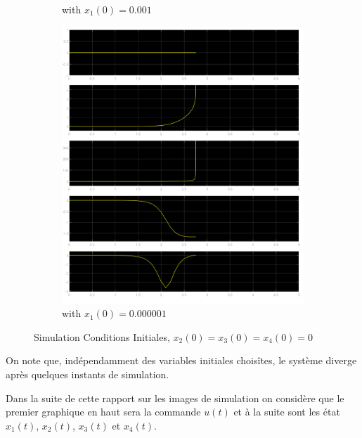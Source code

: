 \documentclass[class=article, crop=false]{standalone}
\begin{document}
\begin{resolution}
\begin{figure}[H]
\begin{subfigure}[b]{0.475\textwidth}
            \caption{with $x_1(0) = 0.001$}
        \end{subfigure}
        \begin{subfigure}[b]{0.475\textwidth}
            \centering
            \includegraphics[width=\textwidth]{../images/simulink_scope2_0_000001.png}
            \caption{with $x_1(0) = 0.000001$}
        \end{subfigure}
        \caption{Simulation Conditions Initiales, $x_2(0) = x_3(0) = x_4(0) = 0$}
        \label{fig:simulink_simulation_conditions_initiales}
    \end{figure}
    On note que, indépendamment des variables initiales choisîtes, le système diverge après quelques instants de simulation.
    \begin{phrase}
        Dans la suite de cette rapport sur les images de simulation on considère que le premier graphique en haut sera la commande $u(t)$ et à la suite sont les état $x_1(t)$, $x_2(t)$, $x_3(t)$ et $x_4(t)$.
    \end{phrase}
\end{resolution}

\newpage
\end{document}
